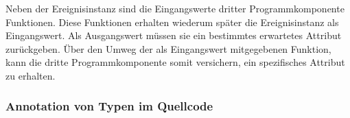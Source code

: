 \documentclass[12pt,a4paper,ngerman]{article}
\begin{document}
\bigskip

Neben der Ereignisinstanz sind die Eingangswerte dritter Programmkomponente Funktionen.
Diese Funktionen erhalten wiederum später die Ereignisinstanz als Eingangswert.
Als Ausgangswert müssen sie ein bestimmtes erwartetes Attribut zurückgeben.
Über den Umweg der als Eingangswert mitgegebenen Funktion, kann die dritte Programmkomponente somit versichern, ein spezifisches Attribut zu erhalten.







\subsubsection{Annotation von Typen im Quellcode}
\label{typeAnnotations}
\end{document}
